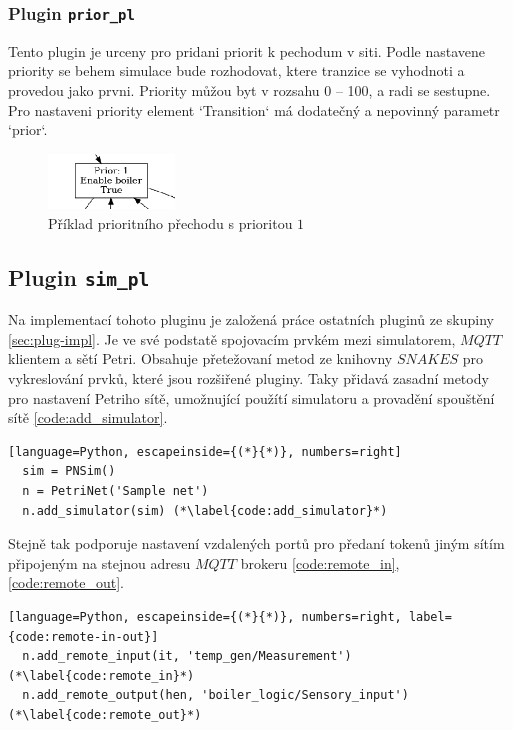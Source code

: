 \subsubsection{Plugin \texttt{prior\_pl}}
\label{subsec:prior_pl}
Tento plugin je urceny pro pridani priorit k pechodum v siti. Podle nastavene priority se behem simulace bude rozhodovat, ktere tranzice se vyhodnoti a provedou jako prvni. Priority můžou byt v rozsahu 0 -- 100, a radi se sestupne. Pro nastaveni priority element `Transition` má dodatečný a nepovinný parametr `prior`. 
\begin{figure}[hbt]
  \centering
  \includegraphics[width=0.3\textwidth]{obrazky-figures/prior-transition.png}
  \caption{Příklad prioritního přechodu s prioritou $1$}
  \label{prior-transition}
\end{figure}

\subsection{Plugin \texttt{sim\_pl}}
\label{sec:aplikace-mqtt}
Na implementací tohoto pluginu je založená práce ostatních pluginů ze skupiny \ref{sec:plug-impl}. Je ve své podstatě spojovacím prvkém mezi simulatorem, $MQTT$ klientem a sětí Petri. Obsahuje přetežovaní metod ze knihovny $SNAKES$ pro vykreslování prvků, které jsou rozšiřené pluginy. Taky přidavá zasadní metody pro nastavení Petriho sítě, umožnující použítí simulatoru a provadění spouštění sítě \ref{code:add_simulator}.
\begin{lstlisting}[language=Python, escapeinside={(*}{*)}, numbers=right]
  sim = PNSim()
  n = PetriNet('Sample net')
  n.add_simulator(sim) (*\label{code:add_simulator}*)
\end{lstlisting}

Stejně tak podporuje nastavení vzdalených portů pro předaní tokenů jiným sítím připojeným na stejnou adresu $MQTT$ brokeru \ref{code:remote_in}, \ref{code:remote_out}.

\begin{lstlisting}[language=Python, escapeinside={(*}{*)}, numbers=right, label={code:remote-in-out}]
  n.add_remote_input(it, 'temp_gen/Measurement') (*\label{code:remote_in}*)
  n.add_remote_output(hen, 'boiler_logic/Sensory_input') (*\label{code:remote_out}*)
\end{lstlisting}


